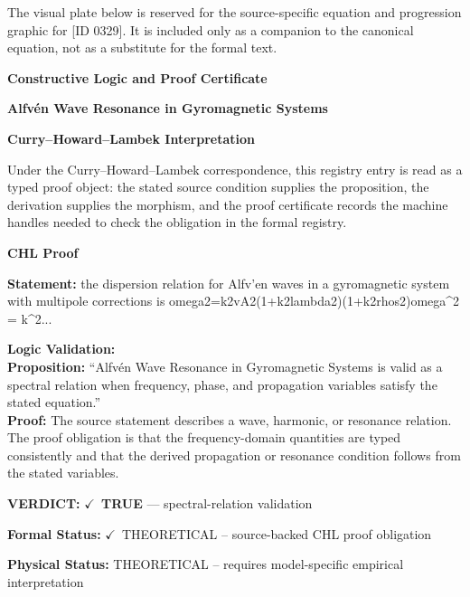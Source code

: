\begingroup\footnotesize\sloppy
The visual plate below is reserved for the source-specific equation and progression graphic for [ID 0329]. It is included only as a companion to the canonical equation, not as a substitute for the formal text.
\par\endgroup
\ifTZPDarkEdition
{}
\fi

\clearpage
\begingroup\tzpsupportsetup
\noindent\textbf{\fontsize{10.8pt}{12.8pt}\selectfont [ID 0329] Constructive Logic and Proof Certificate}\par
\noindent\textbf{\fontsize{10pt}{12pt}\selectfont Alfv\'en Wave Resonance in Gyromagnetic Systems}\par
\vspace{0.45em}
\begingroup
\footnotesize
\setlength{\parskip}{0.22em}
\setlength{\parindent}{0pt}
\noindent\textbf{Curry--Howard--Lambek Interpretation}\par
Under the Curry--Howard--Lambek correspondence, this registry entry is read as a typed proof
object: the stated source condition supplies the proposition, the derivation supplies the
morphism, and the proof certificate records the machine handles needed to check the obligation
in the formal registry.

\vspace{0.45em}
\noindent\textbf{CHL Proof}\par
\textbf{Statement:} the dispersion relation for Alfv'en waves in a gyromagnetic system with multipole
corrections is omega2=k2vA2(1+k2lambda2)(1+k2rhos2)omega\textasciicircum{}2 = k\textasciicircum{}2...

\textbf{Logic Validation:}\\
\textbf{Proposition:} ``Alfvén Wave Resonance in Gyromagnetic Systems is valid as a spectral relation when
frequency, phase, and propagation variables satisfy the stated equation.''\\
\textbf{Proof:} The source statement describes a wave, harmonic, or resonance relation. The proof
obligation is that the frequency-domain quantities are typed consistently and that the
derived propagation or resonance condition follows from the stated variables.

\textbf{VERDICT:} \ensuremath{\checkmark}\ \textbf{TRUE} --- spectral-relation validation

\textbf{Formal Status:} \ensuremath{\checkmark}\ THEORETICAL -- source-backed CHL proof obligation

\textbf{Physical Status:} THEORETICAL -- requires model-specific empirical interpretation
\par\vspace{0.45em}
\par
\ifTZPDarkEdition
{}
\fi
\endgroup
\endgroup
